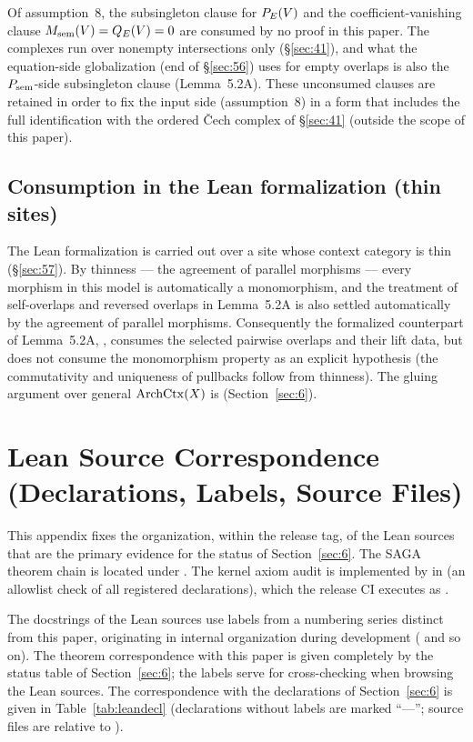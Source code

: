 Of assumption~8, the subsingleton clause for $P_{E}(V)$ and the
coefficient-vanishing clause $M_{\mathrm{sem}}(V)=Q_{E}(V)=0$ are consumed by no
proof in this paper. The complexes run over nonempty intersections
only (\S\ref{sec:41}), and what the equation-side globalization (end
of \S\ref{sec:56}) uses for empty overlaps is also the
$P_{\mathrm{sem}}$-side subsingleton clause (Lemma~5.2A). These unconsumed
clauses are retained in order to fix the input side (assumption~8) in
a form that includes the full identification with the ordered
\v{C}ech complex of \S\ref{sec:41} (outside the scope of this paper).

\subsection{Consumption in the Lean formalization (thin sites)}\label{app:A4}

The Lean formalization is carried out over a site whose context
category is thin (\S\ref{sec:57}). By thinness --- the agreement of
parallel morphisms --- every morphism in this model is automatically a
monomorphism, and the treatment of self-overlaps and reversed overlaps
in Lemma~5.2A is also settled automatically by the agreement of
parallel morphisms. Consequently the formalized counterpart of
Lemma~5.2A, , consumes the
selected pairwise overlaps and their lift data, but does not consume
the monomorphism property as an explicit hypothesis (the commutativity and uniqueness
of pullbacks follow from thinness). The gluing argument over general
$\mathrm{ArchCtx}(X)$ is  (Section~\ref{sec:6}).

\section{Lean Source Correspondence (Declarations, Labels, Source Files)}\label{app:B}

This appendix fixes the organization, within the release tag, of the
Lean sources that are the primary evidence for the status of
Section~\ref{sec:6}. The SAGA theorem chain is located under
. The kernel axiom audit is
implemented by
\allowbreak{}\allowbreak{}
in \allowbreak{} (an allowlist
check of all registered declarations), which the release CI executes as
 \allowbreak{}.

The docstrings of the Lean sources use labels from a numbering series
distinct from this paper, originating in internal organization during
development ( and so on). The theorem
correspondence with this paper is given completely by the status table
of Section~\ref{sec:6}; the labels serve for cross-checking when
browsing the Lean sources. The correspondence with the declarations of
Section~\ref{sec:6} is given in Table~\ref{tab:leandecl} (declarations
without labels are marked ``---''; source files are relative to
).

